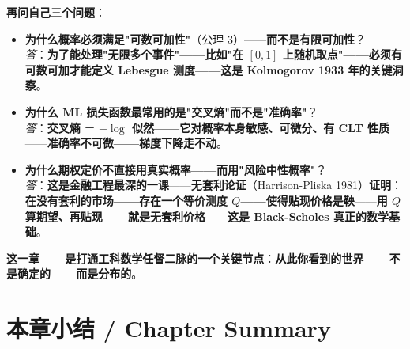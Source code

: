 \textbf{再问自己三个问题}：

\begin{itemize}
\item \textbf{为什么概率必须满足"可数可加性"}（公理 3）——\textbf{而不是有限可加性}？\\
\textit{答}：\textbf{为了能处理"无限多个事件"——比如"在 $[0,1]$ 上随机取点"——必须有可数可加才能定义 Lebesgue 测度——这是 Kolmogorov 1933 年的关键洞察}。

\item \textbf{为什么 ML 损失函数最常用的是"交叉熵"而不是"准确率"}？\\
\textit{答}：\textbf{交叉熵 = $-\log$ 似然——它对概率本身敏感、可微分、有 CLT 性质}——\textbf{准确率不可微——梯度下降走不动}。

\item \textbf{为什么期权定价不直接用真实概率——而用"风险中性概率"}？\\
\textit{答}：\textbf{这是金融工程最深的一课}——\textbf{无套利论证}（Harrison-Pliska 1981）\textbf{证明}：\textbf{在没有套利的市场——存在一个等价测度 $Q$——使得贴现价格是鞅}——\textbf{用 $Q$ 算期望、再贴现——就是无套利价格}——\textbf{这是 Black-Scholes 真正的数学基础}。
\end{itemize}

\textbf{这一章——是\textbf{打通工科数学任督二脉}的一个关键节点}：\textbf{从此你看到的世界——不是确定的——而是分布的}。

\section{本章小结 / Chapter Summary}


